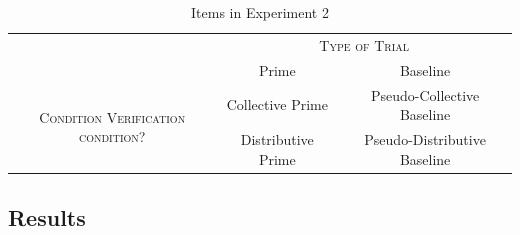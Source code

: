 \documentclass[a4paper, 11pt]{article}
\newcommand{\addMM}[1]{{\leavevmode\color{red}#1}}
\begin{document}
\begin{table}[h]
\begin{center}
\begin{tabular}{ccc}
\toprule
& \multicolumn{2}{c}{\textsc{Type of Trial}}\\
& Prime & Baseline \\
 \cmidrule(r){2-3}
\multirow{2}{*}{\textsc{Condition \addMM{Verification condition?}}} & Collective Prime &  Pseudo-Collective Baseline \\
& Distributive Prime &  Pseudo-Distributive Baseline \\
\bottomrule
\end{tabular}
\end{center}
\caption{Items in Experiment 2}
\label{table.fac}
\end{table}



\subsection{Results}
\end{document}
